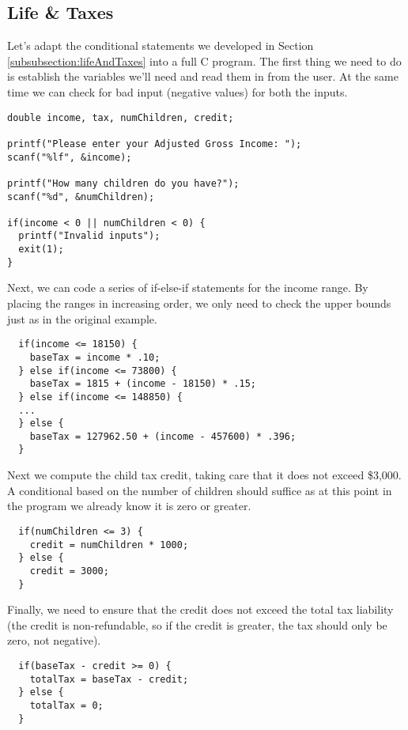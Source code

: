 \subsection{Life \& Taxes}

Let's adapt the conditional statements we developed in Section \ref{subsubsection:lifeAndTaxes}
into a full C program.  The first thing we need to do is establish the variables we'll need and
read them in from the user.  At the same time we can check for bad input (negative values)
for both the inputs.

\begin{verbatim}
double income, tax, numChildren, credit;

printf("Please enter your Adjusted Gross Income: ");
scanf("%lf", &income);

printf("How many children do you have?");
scanf("%d", &numChildren);

if(income < 0 || numChildren < 0) {
  printf("Invalid inputs");   
  exit(1);
}
\end{verbatim}

Next, we can code a series of if-else-if statements for the income range.  By
placing the ranges in increasing order, we only need to check the upper bounds
just as in the original example.

\begin{verbatim}
  if(income <= 18150) {
    baseTax = income * .10;
  } else if(income <= 73800) {
    baseTax = 1815 + (income - 18150) * .15;
  } else if(income <= 148850) {
  ...  
  } else {
    baseTax = 127962.50 + (income - 457600) * .396;
  }
\end{verbatim}

Next we compute the child tax credit, taking care that it does
not exceed \$3,000.  A conditional based on the number of children
should suffice as at this point in the program we already know it is
zero or greater.

\begin{verbatim}
  if(numChildren <= 3) {
    credit = numChildren * 1000;
  } else {
    credit = 3000;
  }
\end{verbatim}

Finally, we need to ensure that the credit does not exceed the total tax
liability (the credit is non-refundable, so if the credit is greater, the tax
should only be zero, not negative).  

\begin{verbatim}
  if(baseTax - credit >= 0) {
    totalTax = baseTax - credit;
  } else {
    totalTax = 0;
  }
\end{verbatim}

